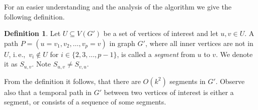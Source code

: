 \documentclass[11pt,a4paper]{article}
\theoremstyle{remark}
\theoremstyle{definition}
\newtheorem{definition}[theorem]{Definition}
\newcommand{\ie}{i.\,e.,\ }
\begin{document}
For an easier understanding and the analysis of the algorithm we give the following definition.
\begin{definition}
    Let $U \subseteq V(G')$ be a set of vertices of interest and let $u,v \in U$.
    A path $P = (u=v_1,v_2, \dots, v_p = v)$  in graph $G'$, where all inner vertices are not in $U$, \ie $v_i \notin U$ for $i \in \{ 2, 3, \dots, p-1\}$,
    is called a \emph{segment} from $u$ to $v$. We denote it as $S_{u,v}$.
    Note $S_{u,v} \neq S_{v,u}$.
\end{definition}
From the definition it follows, that there are $O(k^2)$ segments in $G'$.
Observe also that a temporal path in $G'$ between two vertices of interest is either a segment, or consists of a sequence of some segments.
\end{document}

